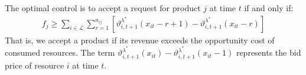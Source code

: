 \documentclass[11pt]{article}
\begin{document}
\noindent
The optimal control is to accept a request for product $j$ at time $t$ if and only if:
\begin{align*}
f_j \geq \sum_{i \in \mathcal{L}} \sum_{r = 1}^{a_{ij}} \left[ \vartheta^{\lambda^{*}}_{i,t+1}(x_{it} - r + 1) - \vartheta^{\lambda^{*}}_{i,t+1}(x_{it} - r) \right]
\end{align*}
That is, we accept a product if its revenue exceeds the opportunity cost of consumed resources. 
The term $\vartheta^{\lambda^{*}}_{i,t+1}(x_{it}) - \vartheta^{\lambda^{*}}_{i,t+1}(x_{it} - 1)$ represents the bid price of resource $i$ at time $t$.

\vspace{0.5cm}






\end{document}
